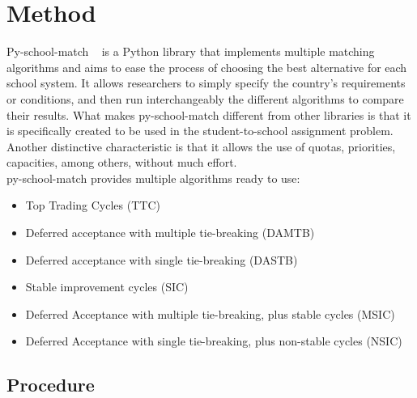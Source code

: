 \documentclass[twocolumn]{article}
\begin{document}
\section{Method} %

Py-school-match ~\cite{article} is a Python library that implements multiple matching algorithms and aims to ease the process of choosing the best alternative for each school system. It allows researchers to simply specify the country’s requirements or conditions, and then run interchangeably the different algorithms to compare their results. What makes py-school-match different from other libraries is that it is specifically created to be used in the student-to-school assignment problem. Another distinctive characteristic is that it allows the use of quotas, priorities, capacities, among others, without much effort.\\
py-school-match provides multiple algorithms ready to use:\\

\begin{itemize}
 \vspace{-0.4cm}\item Top Trading Cycles (TTC) \\
 \vspace{-0.4cm}\item Deferred acceptance with multiple tie-breaking (DAMTB)\\
 \vspace{-0.4cm}\item Deferred acceptance with single tie-breaking (DASTB)\\
 \vspace{-0.4cm}\item Stable improvement cycles (SIC)\\
 \vspace{-0.4cm}\item Deferred Acceptance with multiple tie-breaking, plus stable cycles (MSIC)\\
 \vspace{-0.4cm}\item Deferred Acceptance with single tie-breaking, plus non-stable cycles (NSIC)
\end{itemize}

\subsection{Procedure}
\end{document}
